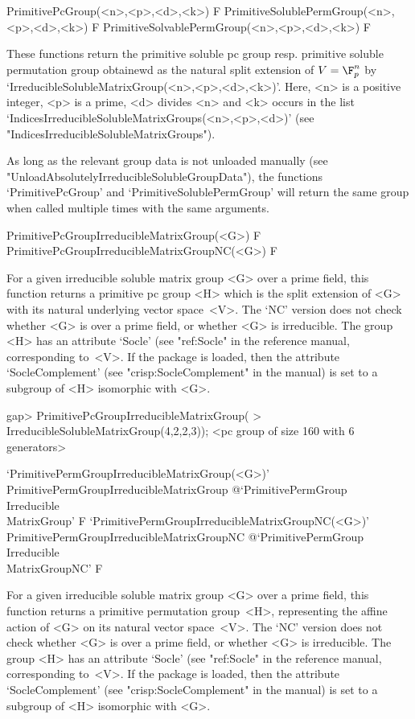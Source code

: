 \>PrimitivePcGroup(<n>,<p>,<d>,<k>) F
\>PrimitiveSolublePermGroup(<n>,<p>,<d>,<k>) F
\>PrimitiveSolvablePermGroup(<n>,<p>,<d>,<k>) F

These functions return the primitive soluble pc group resp. primitive soluble 
permutation group obtainewd as the natural split extension of $V = \F_p^n$ by
`IrreducibleSolubleMatrixGroup(<n>,<p>,<d>,<k>)'. Here, <n> is a positive 
integer, <p> is a prime, <d> divides <n> and <k> occurs in the list 
`IndicesIrreducibleSolubleMatrixGroups(<n>,<p>,<d>)' 
(see "IndicesIrreducibleSolubleMatrixGroups").

As long as the relevant group data is not unloaded manually 
(see "UnloadAbsolutelyIrreducibleSolubleGroupData"), the functions `PrimitivePcGroup'
and `PrimitiveSolublePermGroup' will return the same group when called multiple times
with the same arguments.


\>PrimitivePcGroupIrreducibleMatrixGroup(<G>) F
\>PrimitivePcGroupIrreducibleMatrixGroupNC(<G>) F

For a given irreducible soluble matrix group <G> over a prime field, this function
returns a primitive pc group <H> which is the split extension of <G> with its natural
underlying vector space~<V>. The `NC' version does not check whether <G> is over a prime field, 
or whether <G> is irreducible. The group <H> has an attribute `Socle' (see "ref:Socle" 
in the {\GAP} reference manual, corresponding to~<V>. If the package {\CRISP} is loaded, 
then the attribute `SocleComplement' (see "crisp:SocleComplement" in the {\CRISP} manual) is set to a subgroup of 
<H> isomorphic with <G>.

\beginexample
gap> PrimitivePcGroupIrreducibleMatrixGroup(
>       IrreducibleSolubleMatrixGroup(4,2,2,3));
<pc group of size 160 with 6 generators>
\endexample

\>`PrimitivePermGroupIrreducibleMatrixGroup(<G>)'%
{PrimitivePermGroupIrreducibleMatrixGroup}%
@{`PrimitivePermGroup\\Irreducible\\MatrixGroup'} F
\>`PrimitivePermGroupIrreducibleMatrixGroupNC(<G>)'%
{PrimitivePermGroupIrreducibleMatrixGroupNC}%
@{`PrimitivePermGroup\\Irreducible\\MatrixGroupNC'} F

For a given irreducible soluble matrix group <G> over a prime field, this function
returns a primitive permutation group~<H>, representing the affine action of <G> on its natural
vector space~<V>. The `NC' version does not check whether <G> is over a prime field, 
or whether <G> is irreducible. The group <H> has an attribute `Socle' (see "ref:Socle" 
in the {\GAP} reference manual, corresponding to~<V>. If the package {\CRISP} is loaded, 
then the attribute `SocleComplement' (see "crisp:SocleComplement" in the {\CRISP} manual) is set to a subgroup of 
<H> isomorphic with <G>.

